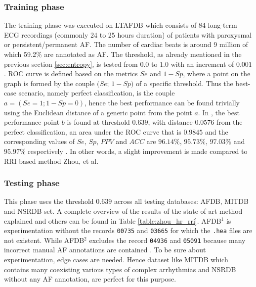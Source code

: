 \subsubsection{Training phase}
The training phase was executed on LTAFDB which consists of 84 long-term ECG recordings (commonly 24 to 25 hours duration) of patients with paroxysmal or persistent/permanent AF. The number of cardiac beats is around 9 million of which 59.2\% are annotated as AF. The threshold, as already mentioned in the previous section \ref{sec:entropy}, is tested from $0.0$ to $1.0$  with an increment of $0.001$. ROC curve is defined based on the metrics $Se$ and $1-Sp$, where a point on the graph is formed by the couple $(Se$; $1-Sp)$ of a specific threshold. Thus the best-case scenario, namely perfect classification, is the couple $a=(Se=1; 1-Sp=0)$, hence the best performance can be found trivially using the Euclidean distance of a generic point from the point $a$. In , the best performance point $b$ is found at threshold $0.639$, with distance $0.0576$ from the perfect classification, an area under the ROC curve that is $0.9845$ and the corresponding values of $Se$, $Sp$, $PPV$ and $ACC$ are $96.14\%$, $95.73\%$, $97.03\%$ and $95.97\%$ respectively \cite{zhou2015}. In other words, a slight improvement is made compared to RRI based method Zhou, et al\cite{zhou2014}.


\subsubsection{Testing phase}
This phase uses the threshold $0.639$ across all testing databases: AFDB, MITDB\cite{mitdb} and NSRDB\cite{nsrdb} set. A complete overview of the results of the state of art method explained and others can be found in Table \ref{table:zhou_hr_rri}.
AFDB$^1$ is experimentation without the records \verb|00735| and \verb|03665| for which the \verb|.hea| files are not existent. While AFDB$^2$ excludes the record \verb|04936| and \verb|05091| because many incorrect manual AF annotations are contained \cite{lee2013}. 
To be sure about experimentation, edge cases are needed. Hence dataset like MITDB which contains many coexisting various types of complex arrhythmias and NSRDB without any AF annotation, are perfect for this purpose.

